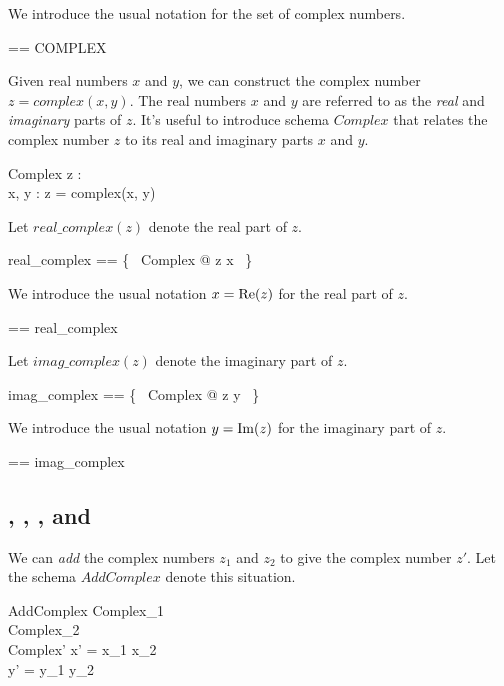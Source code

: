 \documentclass[11pt, oneside]{article}
\begin{document}
We introduce the usual notation for the set of complex numbers.

\begin{zed}
\C == COMPLEX
\end{zed}

Given real numbers $x$ and $y$, we can construct the complex number
$z = complex(x,y)$.
The real numbers $x$ and $y$ are referred to as the \textit{real} and \textit{imaginary} parts of $z$.
It's useful to introduce schema $Complex$ that relates the complex number $z$ to its
real and imaginary parts $x$ and $y$.

\begin{schema}{Complex}
	z : \C \\
	x, y : \R
\where
	z = complex(x, y)
\end{schema}

Let $real\_complex(z)$ denote the real part of $z$.

\begin{zed}
	real\_complex == \{~ Complex @ z \mapsto x ~\}
\end{zed}

We introduce the usual notation $x = \operatorname{Re}(z)$ for the real part of $z$.

\begin{zed}
	\realC == real\_complex
\end{zed}

Let $imag\_complex(z)$ denote the imaginary part of $z$.

\begin{zed}
	imag\_complex == \{~ Complex @ z \mapsto y ~\}
\end{zed}

We introduce the usual notation $y = \operatorname{Im}(z)$ for the imaginary part of $z$.

\begin{zed}
	\imagC == imag\_complex
\end{zed}

\subsection{, , , and }

We can \textit{add} the complex numbers $z_1$ and $z_2$ to give the
complex number $z'$.
Let the schema $AddComplex$ denote this situation.

\begin{schema}{AddComplex}
	Complex_1 \\
	Complex_2 \\
	Complex'
\where
	x' = x_1 \addR x_2 \\
	y' = y_1 \addR y_2
\end{schema}
\end{document}
